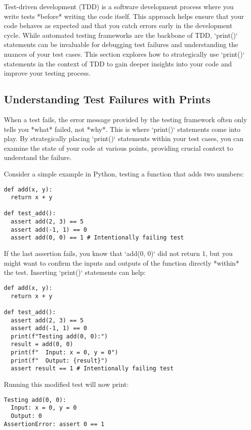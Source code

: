 \documentclass{article}
\begin{document}
{{{{Test-driven development (TDD) is a software development process where you write tests *before* writing the code itself. This approach helps ensure that your code behaves as expected and that you catch errors early in the development cycle. While automated testing frameworks are the backbone of TDD, `print()` statements can be invaluable for debugging test failures and understanding the nuances of your test cases. This section explores how to strategically use `print()` statements in the context of TDD to gain deeper insights into your code and improve your testing process.

\subsection*{Understanding Test Failures with Prints}

When a test fails, the error message provided by the testing framework often only tells you *what* failed, not *why*. This is where `print()` statements come into play. By strategically placing `print()` statements within your test cases, you can examine the state of your code at various points, providing crucial context to understand the failure.

Consider a simple example in Python, testing a function that adds two numbers:

\begin{verbatim}
def add(x, y):
  return x + y

def test_add():
  assert add(2, 3) == 5
  assert add(-1, 1) == 0
  assert add(0, 0) == 1 # Intentionally failing test
\end{verbatim}

If the last assertion fails, you know that `add(0, 0)` did not return 1, but you might want to confirm the inputs and outputs of the function directly *within* the test. Inserting `print()` statements can help:

\begin{verbatim}
def add(x, y):
  return x + y

def test_add():
  assert add(2, 3) == 5
  assert add(-1, 1) == 0
  print(f"Testing add(0, 0):")
  result = add(0, 0)
  print(f"  Input: x = 0, y = 0")
  print(f"  Output: {result}")
  assert result == 1 # Intentionally failing test
\end{verbatim}

Running this modified test will now print:

\begin{verbatim}
Testing add(0, 0):
  Input: x = 0, y = 0
  Output: 0
AssertionError: assert 0 == 1
\end{verbatim}

}}}}
\end{document}
